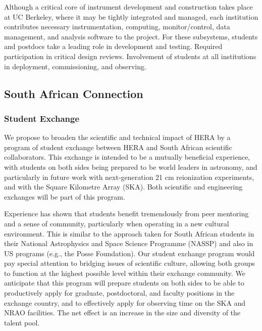 \documentclass[preprint]{aastex}
\begin{document}
Although a critical core of instrument development and construction takes place at UC Berkeley, where it may be tightly
integrated and managed, each institution contributes necessary instrumentation, computing, monitor/control, data management, and
analysis software to the project.  
For these subsystems, students and postdocs take a leading role in development and testing.
Required participation in critical design reviews.
Involvement of students at all institutions in deployment, commissioning, and observing.


\subsection{South African Connection}

\subsubsection{Student Exchange}

We propose to broaden the scientific and technical impact of HERA by a program of student exchange between HERA and South African scientific collaborators.  This exchange is intended to be a mutually beneficial experience, with students on both sides being prepared to be world leaders in astronomy, and particularly in future work with next-generation 21 cm reionization experiments, and with the Square Kilometre Array (SKA).  Both scientific and engineering exchanges will be part of this program.  

Experience has shown that students benefit tremendously from peer mentoring and a sense of community, particularly when operating in a new cultural environment.  This is similar to the approach taken for South African students in their National Astrophysics and Space Science Programme (NASSP)
and also in US programs (e.g., the Posse Foundation).
Our student exchange program would pay special attention to bridging issues of scientific culture, allowing both groups to function at the highest possible level within their exchange community.  We anticipate that this program will prepare students on both sides to be able to productively apply for graduate, postdoctoral, and faculty positions in the exchange country, and to effectively apply for observing time on the SKA and NRAO facilities.  The net effect is an increase in the size and diversity of the talent pool.
\end{document}
